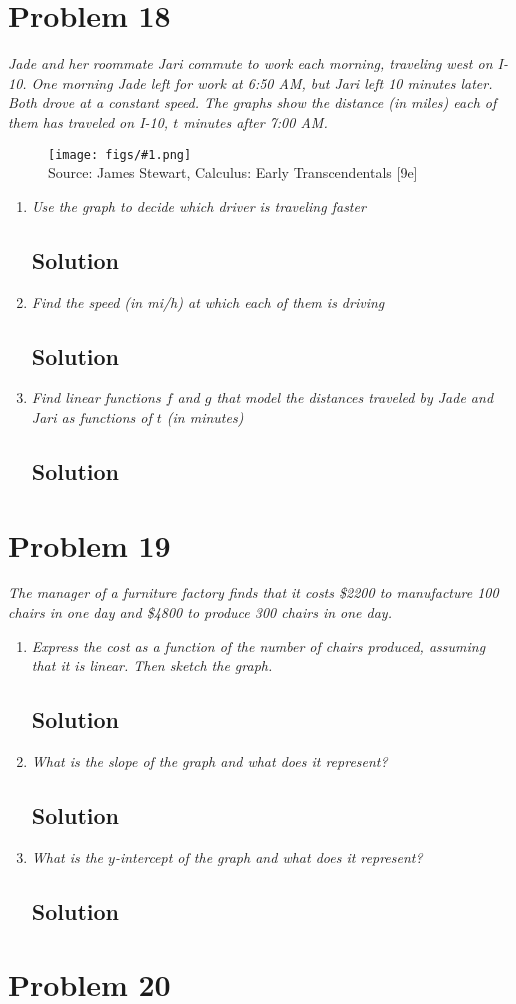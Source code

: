 \documentclass[11pt]{article}
\newcommand{\soln}{\subsection*}
\newcommand{\qn}{\textit}
\newcommand{\imagesource}[1]{{\footnotesize Source: #1}}
\newcommand{\imgqn}[1]{
	\begin{figure}[H]
		\centering
		\texttt{[image: figs/\#1.png]}\\
		\imagesource{James Stewart, Calculus: Early Transcendentals [9e]}
	\end{figure}
}
\begin{document}
\section*{Problem 18}

\qn{Jade and her roommate Jari commute to work each morning, traveling west on I-10. One morning Jade left for work at 6:50 AM, but Jari left 10 minutes later. Both drove at a constant speed. The graphs show the distance (in miles) each of them has traveled on I-10, $t$ minutes after 7:00 AM.}

\imgqn{1.2.18}

\begin{enumerate}
	\item \qn{Use the graph to decide which driver is traveling faster}
	\soln{Solution}
	
	\item \qn{Find the speed (in mi/h) at which each of them is driving}
	\soln{Solution}
	
	\item \qn{Find linear functions $f$ and $g$ that model the distances traveled by Jade and Jari as functions of $t$ (in minutes)}
	\soln{Solution}
\end{enumerate}

\section*{Problem 19}

\qn{The manager of a furniture factory finds that it costs \$2200 to manufacture 100 chairs in one day and \$4800 to produce 300 chairs in one day.}

\begin{enumerate}
	\item \qn{Express the cost as a function of the number of chairs produced, assuming that it is linear. Then sketch the graph.}
	\soln{Solution}
	
	\item \qn{What is the slope of the graph and what does it represent?}
	\soln{Solution}
	
	\item \qn{What is the $y$-intercept of the graph and what does it represent?}
	\soln{Solution}
\end{enumerate}

\section*{Problem 20}
\end{document}
